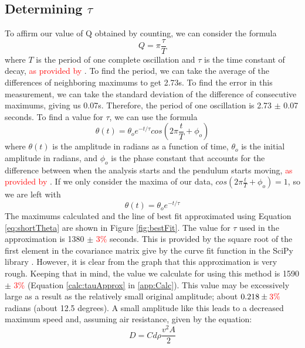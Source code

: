 \documentclass[11pt]{article}
\begin{document}
        \subsection{Determining $\tau$}
            To affirm our value of Q obtained by counting, we can consider the formula
            \begin{equation}
                Q = \pi \frac{\tau}{T}
                \label{eq:qTauRelation}
            \end{equation} 
            where $T$ is the period of one complete oscillation and $\tau$ is the time constant of decay, \textcolor{red}{as provided by \cite{labManual}}. To find the period, we can take the average of the differences of neighboring maximums to get 2.73s. To find the error in this measurement, we can take the standard deviation of the difference of consecutive maximums, giving us 0.07s. Therefore, the period of one oscillation is 2.73 $\pm$ 0.07 seconds.
            To find a value for $\tau$, we can use the formula
            \begin{equation}
                \theta(t) = \theta_oe^{-t/\tau}cos(2\pi\frac{t}{T}+\phi_o)
                \label{eq:theta}
            \end{equation}
            where $\theta(t)$ is the amplitude in radians as a function of time, $\theta_o$ is the initial amplitude in radians, and $\phi_o$ is the phase constant that accounts for the difference between when the analysis starts and the pendulum starts moving, \textcolor{red}{as provided by \cite{labManual}}. If we only consider the maxima of our data, $cos(2\pi\frac{t}{T}+\phi_o) = 1$, so we are left with 
            \begin{equation}
                \theta(t) = \theta_oe^{-t/\tau}
                \label{eq:shortTheta}
            \end{equation}
            The maximums calculated and the line of best fit approximated using Equation \ref{eq:shortTheta} are shown in Figure \ref{fig:bestFit}. The value for $\tau$ used in the approximation is 1380 $\pm$ \textcolor{red}{3\%} seconds. This is provided by the square root of the first element in the covariance matrix give by the curve fit function in the SciPy library \cite{2020SciPy-NMeth}. However, it is clear from the graph that this approximation is very rough. Keeping that in mind, the value we calculate for using this method is 1590 $\pm$ \textcolor{red}{3\%} (Equation \ref{calc:tauApprox} in \ref{app:Calc}). This value may be excessively large as a result as the relatively small original amplitude; about $0.218 \pm \textcolor{red}{3\%}$ radians (about 12.5 degrees). A small amplitude like this leads to a decreased maximum speed and, assuming air resistance, given by the equation:
            \begin{equation}
                D = Cd\rho\frac{v^2A}{2}
            \end{equation}
            
\end{document}

